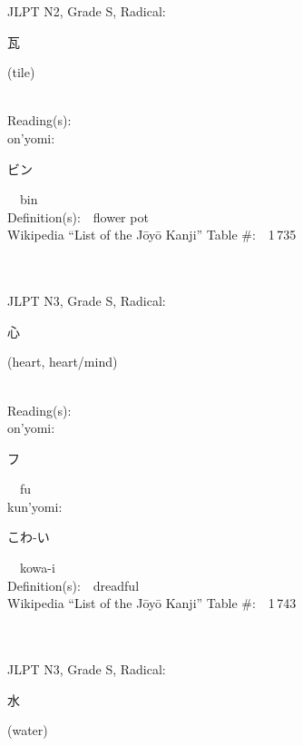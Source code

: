 \begin{multicols}{2}
{JLPT N2, Grade S, Radical:\ \ {\begin{CJK}{UTF8}{min} 瓦 \end{CJK}} (tile) } \\
Reading(s):\ \ \\
{\hspace*{1em}}on'yomi:\ \ \\
{\hspace*{2em}}{\begin{CJK}{UTF8}{min} ビン \end{CJK}}\ \ bin\ \ \\
Definition(s):\ \ flower pot \\
Wikipedia ``List of the J\=oy\=o Kanji'' Table \#:\ \ 1\,735 \\
\ \ \\
{\fontsize{34pt}{40pt}  }\ \ \\  %
{JLPT N3, Grade S, Radical:\ \ {\begin{CJK}{UTF8}{min} 心 \end{CJK}} (heart, heart/mind) } \\
Reading(s):\ \ \\
{\hspace*{1em}}on'yomi:\ \ \\
{\hspace*{2em}}{\begin{CJK}{UTF8}{min} フ \end{CJK}}\ \ fu\ \ \\
{\hspace*{1em}}kun'yomi:\ \ \\
{\hspace*{2em}}{\begin{CJK}{UTF8}{min} こわ-い \end{CJK}}\ \ kowa-i\ \ \\
Definition(s):\ \ dreadful \\
Wikipedia ``List of the J\=oy\=o Kanji'' Table \#:\ \ 1\,743 \\
\ \ \\
{\fontsize{34pt}{40pt}  }\ \ \\  %
{JLPT N3, Grade S, Radical:\ \ {\begin{CJK}{UTF8}{min} 水 \end{CJK}} (water) } \\

\end{multicols}
